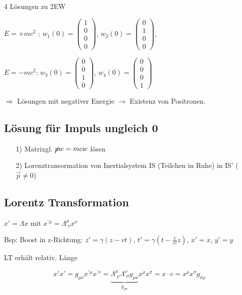 4 Lösungen zu 2EW

\(E=+mc^2\) : \(w_1(0) =  \begin{pmatrix}1\\0\\0\\0\end{pmatrix}\), \(w_2(0) =  \begin{pmatrix}0\\1\\0\\0\end{pmatrix}\), 

\(E=-mc^2\): \(w_3(0) =  \begin{pmatrix}0\\0\\1\\0\end{pmatrix}\), \(w_4(0) =  \begin{pmatrix}0\\0\\0\\1\end{pmatrix}\)

\(\Rightarrow \) Lösungen mit negativer Energie \(\rightarrow \) Existenz von Positronen. 

\subsection{Lösung für Impuls ungleich 0}

\begin{enumerate}
\item[1)] Matrixgl. \(\cancel p w = mcw\) lösen
\item[2)] Lorenztransormation von Inertialsystem IS (Teilchen in Ruhe) in IS' (\(\vec p\neq 0\))
\end{enumerate}

\subsection{Lorentz Transformation}

\(x' = \Lambda x\)  mit \(x^{'\mu}=\Lambda^\mu_{\,\, \nu}x^\nu\)

Bsp: Boost in z-Richtung: \(z' = \gamma(z-vt)\), \(t' = \gamma(t-\frac{v}{c^2}z)\), \(x' = x\), \(y'=y\)

LT erhält relativ. Länge

\[x'x' = g_{\mu\nu}x^{'\mu}x^{'\nu} = \underbrace{\Lambda^\mu_{\,\, \rho}  \Lambda^\nu_{\,\, \sigma}g_{\mu\nu}}_{g_{\rho\sigma}}x^\rho x^\sigma = x\cdot c = x^\rho x^\sigma g_{\sigma\rho}\]

